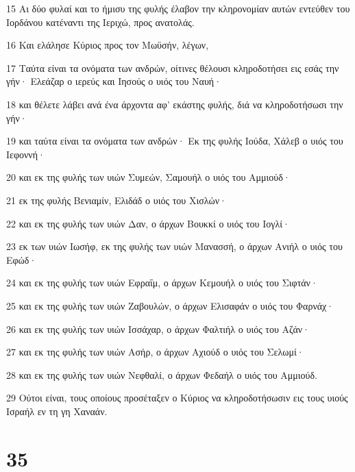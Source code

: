 \par 15 Αι δύο φυλαί και το ήμισυ της φυλής έλαβον την κληρονομίαν αυτών εντεύθεν του Ιορδάνου κατέναντι της Ιεριχώ, προς ανατολάς.
\par 16 Και ελάλησε Κύριος προς τον Μωϋσήν, λέγων,
\par 17 Ταύτα είναι τα ονόματα των ανδρών, οίτινες θέλουσι κληροδοτήσει εις εσάς την γήν· Ελεάζαρ ο ιερεύς και Ιησούς ο υιός του Ναυή·
\par 18 και θέλετε λάβει ανά ένα άρχοντα αφ' εκάστης φυλής, διά να κληροδοτήσωσι την γήν·
\par 19 και ταύτα είναι τα ονόματα των ανδρών· Εκ της φυλής Ιούδα, Χάλεβ ο υιός του Ιεφοννή·
\par 20 και εκ της φυλής των υιών Συμεών, Σαμουήλ ο υιός του Αμμιούδ·
\par 21 εκ της φυλής Βενιαμίν, Ελιδάδ ο υιός του Χισλών·
\par 22 και εκ της φυλής των υιών Δαν, ο άρχων Βουκκί ο υιός του Ιογλί·
\par 23 εκ των υιών Ιωσήφ, εκ της φυλής των υιών Μανασσή, ο άρχων Ανιήλ ο υιός του Εφώδ·
\par 24 και εκ της φυλής των υιών Εφραΐμ, ο άρχων Κεμουήλ ο υιός του Σιφτάν·
\par 25 και εκ της φυλής των υιών Ζαβουλών, ο άρχων Ελισαφάν ο υιός του Φαρνάχ·
\par 26 και εκ της φυλής των υιών Ισσάχαρ, ο άρχων Φαλτιήλ ο υιός του Αζάν·
\par 27 και εκ της φυλής των υιών Ασήρ, ο άρχων Αχιούδ ο υιός του Σελωμί·
\par 28 και εκ της φυλής των υιών Νεφθαλί, ο άρχων Φεδαήλ ο υιός του Αμμιούδ.
\par 29 Ούτοι είναι, τους οποίους προσέταξεν ο Κύριος να κληροδοτήσωσιν εις τους υιούς Ισραήλ εν τη γη Χαναάν.

\chapter{35}

